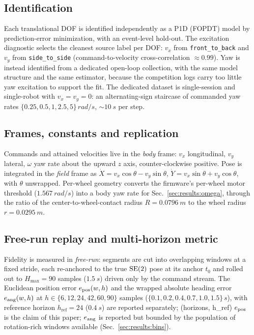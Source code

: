 \subsection{Identification}
\label{sec:method:id}
Each translational DOF is identified independently as a P1D (FOPDT) model by prediction-error minimization, with an event-level hold-out. The excitation diagnostic selects the cleanest source label per DOF: $v_x$ from \texttt{front\_to\_back} and $v_y$ from \texttt{side\_to\_side} (command-to-velocity cross-correlation $\approx 0.99$).
Yaw is instead identified from a dedicated open-loop collection, with the same model structure and the same estimator, because the competition logs carry too little yaw excitation to support the fit. The dedicated dataset is single-session and single-robot with $v_x=v_y=0$: an alternating-sign staircase of commanded yaw rates $\{0.25,0.5,1,2.5,5\}\,\si{rad/s}$, $\sim\SI{10}{s}$ per step.

\subsection{Frames, constants and replication}
\label{sec:method:geometry}
Commands and attained velocities live in the \emph{body} frame: $v_x$ longitudinal, $v_y$ lateral, $\omega$ yaw rate about the upward $z$ axis, counter-clockwise positive. Pose is integrated in the \emph{field} frame as $\dot{X} = v_x\cos\theta - v_y\sin\theta$, $\dot{Y} = v_x\sin\theta + v_y\cos\theta$, with $\theta$ unwrapped.
Per-wheel geometry converts the firmware's per-wheel motor threshold ($\SI{1.567}{rad/s}$) into a body yaw rate for Sec.~\ref{sec:results:omega}, through the ratio of the center-to-wheel-contact radius $R=\SI{0.0796}{m}$ to the wheel radius $r=\SI{0.0295}{m}$.

\subsection{Free-run replay and multi-horizon metric}
\label{sec:method:metric}
Fidelity is measured in \emph{free-run}: segments are cut into overlapping windows at a fixed stride, each re-anchored to the true $\mathrm{SE}(2)$ pose at its anchor $t_0$ and rolled out to $H_{\max}=90$ samples ($\SI{1.5}{s}$) driven only by the command stream. The Euclidean position error $e_{\mathrm{pos}}(w,h)$ and the wrapped absolute heading error $e_{\mathrm{ang}}(w,h)$ at $h\in\{6,12,24,42,60,90\}$ samples ($\{0.1,0.2,0.4,0.7,1.0,1.5\}\,\si{s}$), with reference horizon $h_{\mathrm{ref}}=24$ ($\SI{0.4}{s}$) are reported separately; %
(horizons, h\_ref) $e_{\mathrm{pos}}$ is the claim of this paper; $e_{\mathrm{ang}}$ is reported but bounded by the population of rotation-rich windows available (Sec.~\ref{sec:results:bins}).

